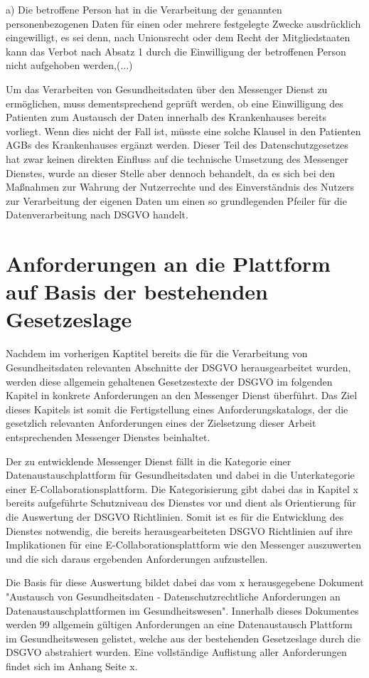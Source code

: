 a) Die betroffene Person hat in die Verarbeitung der genannten personenbezogenen Daten für einen oder mehrere festgelegte Zwecke ausdrücklich eingewilligt, es sei denn, nach Unionsrecht oder dem Recht der Mitgliedstaaten kann das Verbot nach Absatz 1 durch die Einwilligung der betroffenen Person nicht aufgehoben werden,(...)

Um das Verarbeiten von Gesundheitsdaten über den Messenger Dienst zu ermöglichen, muss dementsprechend geprüft werden, ob eine Einwilligung des Patienten zum Austausch der Daten innerhalb des Krankenhauses bereits vorliegt. Wenn dies nicht der Fall ist, müsste eine solche Klausel in den Patienten AGBs des Krankenhauses ergänzt werden. Dieser Teil des Datenschutzgesetzes hat zwar keinen direkten Einfluss auf die technische Umsetzung des Messenger Dienstes, wurde an dieser Stelle aber dennoch behandelt, da es sich bei den Maßnahmen zur Wahrung der Nutzerrechte und des Einverständnis des Nutzers zur Verarbeitung der eigenen Daten um einen so grundlegenden Pfeiler für die Datenverarbeitung nach DSGVO handelt.

\section{Anforderungen an die Plattform auf Basis der bestehenden Gesetzeslage}\label{section:aadpabsbg}
Nachdem im vorherigen Kaptitel bereits die für die Verarbeitung von Gesundheitsdaten relevanten Abschnitte der DSGVO herausgearbeitet wurden, werden diese allgemein gehaltenen Gesetzestexte der DSGVO im folgenden Kapitel in konkrete Anforderungen an den Messenger Dienst überführt.  Das Ziel dieses Kapitels ist somit die Fertigstellung eines Anforderungskatalogs, der die gesetzlich relevanten Anforderungen eines der Zielsetzung dieser Arbeit entsprechenden Messenger Dienstes beinhaltet.

Der zu entwicklende Messenger Dienst fällt in die Kategorie einer Datenaustauschplattform für Gesundheitsdaten und dabei in die Unterkategorie einer E-Collaborationsplattform. Die Kategorisierung gibt dabei das in Kapitel x bereits aufgeführte Schutzniveau des Dienstes vor und dient als Orientierung für die Auswertung der DSGVO Richtlinien. Somit ist es für die Entwicklung des Dienstes notwendig, die bereits herausgearbeiteten DSGVO Richtlinien auf ihre Implikationen für eine E-Collaborationsplattform wie den Messenger auszuwerten und die sich daraus ergebenden Anforderungen aufzustellen. 

Die Basis für diese Auswertung bildet dabei das vom x herausgegebene Dokument "Austausch von Gesundheitsdaten - Datenschutzrechtliche Anforderungen an Datenaustauschplattformen im Gesundheitswesen". Innerhalb dieses Dokumentes werden 99 allgemein gültigen Anforderungen an eine Datenaustausch Plattform im Gesundheitswesen gelistet, welche aus der bestehenden Gesetzeslage durch die DSGVO abstrahiert wurden.
Eine vollständige Auflistung aller Anforderungen findet sich im Anhang Seite x.

